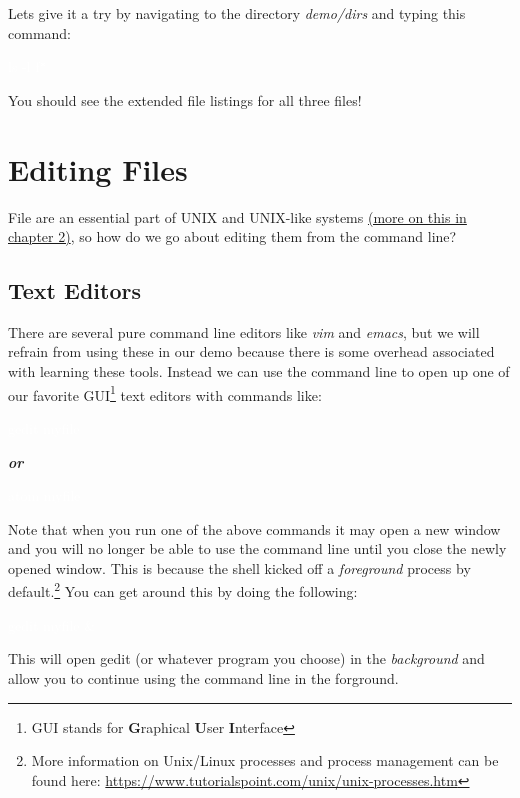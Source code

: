 \documentclass[oneside]{book}
\newcommand{\commandline}[1]{\begin{center} \colorbox{Dark}{\textcolor{white}{#1}} \end{center}}
\begin{document}
Lets give it a try by navigating to the directory \textit{demo/dirs} and typing this command:
\commandline{ls -l f*}

You should see the extended file listings for all three files!

\section{Editing Files}
File are an essential part of UNIX and UNIX-like systems \hyperref[sec:files_in_unix]{(more on this in chapter 2)}, so how do we go about editing them from the command line? 


\subsection{Text Editors}
There are several pure command line editors like \textit{vim} and \textit{emacs}, but we will refrain from using these in our demo because there is some overhead associated with learning these tools. Instead we can use the command line to open up one of our favorite GUI\footnote{GUI stands for \textbf{G}raphical \textbf{U}ser \textbf{I}nterface} text editors with commands like: 
\commandline{gedit myfile}
\begin{center}
    \textbf{\textit{or}}
\end{center}
\commandline{atom myfile}
Note that when you run one of the above commands it may open a new window and you will no longer be able to use the command line until you close the newly opened window. This is because the shell kicked off a \textit{foreground} process by default.\footnote{More information on Unix/Linux processes and process management can be found here: \url{https://www.tutorialspoint.com/unix/unix-processes.htm}} You can get around this by doing the following:
\commandline{gedit myfile \&}
This will open gedit (or whatever program you choose) in the \textit{background} and allow you to continue using the command line in the forground. \\
\end{document}
